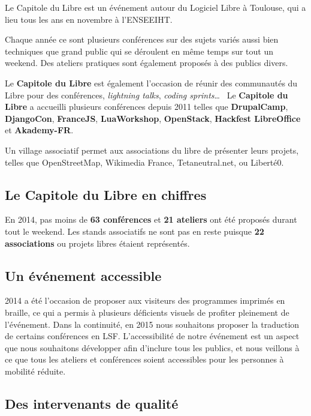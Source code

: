 
Le Capitole du Libre est un événement autour du Logiciel Libre à Toulouse, qui a lieu tous les ans en novembre à l'ENSEEIHT.

Chaque année ce sont plusieurs conférences sur des sujets variés aussi bien techniques que grand public qui se déroulent en même temps sur tout un weekend. Des ateliers pratiques sont également proposés à des publics divers.

\Separateur

Le \textbf{Capitole du Libre} est également l'occasion de réunir des communautés du Libre pour des conférences, \textit{lightning talks}, \textit{coding sprints}\dots ~ Le \textbf{Capitole du Libre} a accueilli plusieurs conférences depuis 2011 telles que \textbf{DrupalCamp}, \textbf{DjangoCon},  \textbf{FranceJS}, \textbf{LuaWorkshop}, \textbf{OpenStack}, \textbf{Hackfest LibreOffice} et \textbf{Akademy-FR}.

\Separateur

Un village associatif permet aux associations du libre de présenter leurs projets, telles que OpenStreetMap, Wikimedia France, Tetaneutral.net, ou Liberté0.

\subsection{Le Capitole du Libre en chiffres}

En 2014, pas moins de \textbf{63 conférences} et \textbf{21 ateliers} ont été proposés durant tout le weekend. Les stands associatifs ne sont pas en reste puisque \textbf{22 associations} ou projets libres étaient représentés.

\subsection{Un événement accessible}

2014 a été l'occasion de proposer aux visiteurs des programmes imprimés en braille, ce qui a permis à plusieurs déficients visuels de profiter pleinement de l'événement. Dans la continuité, en 2015 nous souhaitons proposer la traduction de certains conférences en LSF. 
L'accessibilité de notre événement est un aspect que nous souhaitons développer afin d'inclure tous les publics, et nous veillons à ce que tous les ateliers et conférences soient accessibles pour les personnes à mobilité réduite.

\subsection{Des intervenants de qualité}

